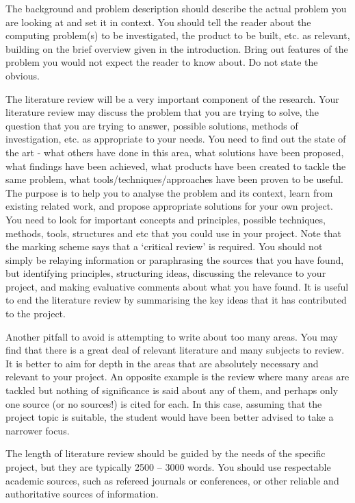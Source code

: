 {    The background and problem description should describe the actual problem you are looking at and set it in context. You should tell the reader about the computing problem(s)
    to be investigated, the product to be built, etc. as relevant, building on the brief overview given in the introduction. Bring out features of the problem you would not
    expect the reader to know about. Do not state the obvious.

    The literature review will be a very important component of the research. Your literature review may discuss the problem that you are trying to solve, the question that
    you are trying to answer, possible solutions, methods of investigation, etc. as appropriate to your needs. You need to find out the state of the art - what others have
    done in this area, what solutions have been proposed, what findings have been achieved, what products have been created to tackle the same problem, what
    tools/techniques/approaches have been proven to be useful. The purpose is to help you to analyse the problem and its context, learn from existing related work, and
    propose appropriate solutions for your own project. You need to look for important concepts and principles, possible techniques, methods, tools, structures and etc that
    you could use in your project.
    Note that the marking scheme says that a ‘critical review’ is required. You should not simply be relaying information or paraphrasing the sources that you have found, but
    identifying principles, structuring ideas, discussing the relevance to your project, and making evaluative comments about what you have found. It is useful to end the
    literature review by summarising the key ideas that it has contributed to the project.

    Another pitfall to avoid is attempting to write about too many areas. You may find that there is a great deal of relevant literature and many subjects to review. It is
    better to aim for depth in the areas that are absolutely necessary and relevant to your project. An opposite example is the review where many areas are tackled but nothing
    of significance is said about any of them, and perhaps only one source (or no sources!) is cited for each. In this case, assuming that the project topic is suitable, the
    student would have been better advised to take a narrower focus.

    The length of literature review should be guided by the needs of the specific project, but they are typically 2500 – 3000 words. You should use respectable academic sources,
    such as refereed journals or conferences, or other reliable and authoritative sources of information.

}
